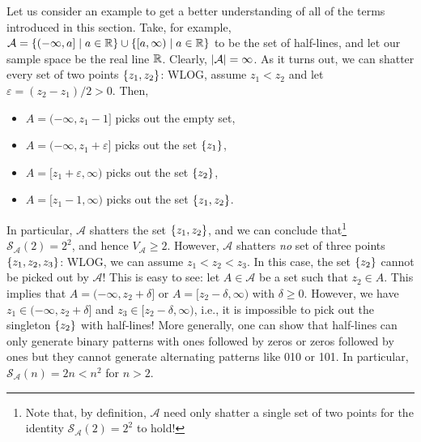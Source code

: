 Let us consider an example to get a better understanding of all of the terms introduced in this section. Take, for example, $\mathcal{A} = \set{(-\infty, a] \with a \in \R} \cup \set{[a, \infty) \with a \in \R}$ to be the set of half-lines, and let our sample space be the real line $\mathbb{R}$. Clearly, $\abs{\mathcal{A}} = \infty$. As it turns out, we can shatter every set of two points $\set{z_1, z_2}$: WLOG, assume $z_1 < z_2$ and let $\varepsilon = (z_2 - z_1)/2 > 0$. Then,
\begin{itemize}
    \item $A = (-\infty, z_1 - 1]$ picks out the empty set,

    \item $A = (-\infty, z_1 + \varepsilon]$ picks out the set $\set{z_1}$,

    \item $A = [z_1 + \varepsilon, \infty)$ picks out the set $\set{z_2}$,

    \item $A = [z_1 - 1, \infty)$ picks out the set $\set{z_1, z_2}$.
\end{itemize}
In particular, $\mathcal{A}$ shatters the set $\set{z_1, z_2}$, and we can conclude that\footnote{Note that, by definition, $\mathcal{A}$ need only shatter a single set of two points for the identity $\mathcal{S}_{\mathcal{A}}(2) = 2^2$ to hold!} $\mathcal{S}_{\mathcal{A}}(2) = 2^2$, and hence $V_{\mathcal{A}} \geq 2$. However, $\mathcal{A}$ shatters \emph{no} set of three points $\set{z_1, z_2, z_3}$: WLOG, we can assume $z_1 < z_2 < z_3$. In this case, the set $\set{z_2}$ cannot be picked out by $\mathcal{A}$! This is easy to see: let $A \in \mathcal{A}$ be a set such that $z_2 \in A$. This implies that $A = (-\infty, z_2 + \delta]$ or $A = [z_2 - \delta, \infty)$ with $\delta \geq 0$. However, we have $z_1 \in (-\infty, z_2 + \delta]$ and $z_3 \in [z_2 - \delta, \infty)$, i.e., it is impossible to pick out the singleton $\set{z_2}$ with half-lines! More generally, one can show that half-lines can only generate binary patterns with ones followed by zeros or zeros followed by ones but they cannot generate alternating patterns like 010 or 101. In particular, $\mathcal{S}_{\mathcal{A}}(n) = 2n < n^2$ for $n > 2$.

